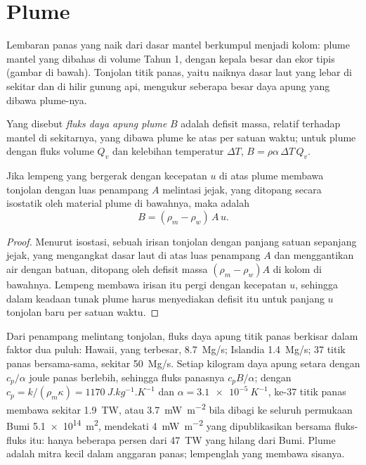 \section{Plume}

Lembaran panas yang naik dari dasar mantel berkumpul menjadi kolom: plume mantel
yang dibahas di volume Tahun 1, dengan kepala besar dan ekor tipis (gambar di bawah).
Tonjolan titik panas, yaitu naiknya dasar laut yang lebar di sekitar dan di hilir
gunung api, mengukur seberapa besar daya apung yang dibawa plume-nya.

\begin{definition}\label{def:b3:mantle-convection:buoyancy-flux}
Yang disebut \emph{fluks daya apung plume} $B$ adalah defisit
massa, relatif terhadap mantel di sekitarnya, yang dibawa plume ke atas per satuan
waktu; untuk plume dengan fluks volume $Q_v$ dan kelebihan temperatur $\Delta T$,
$B = \rho\alpha\,\Delta T\,Q_v$.
\end{definition}

\begin{proposition}\label{prop:b3:mantle-convection:swell}
Jika lempeng yang bergerak dengan kecepatan $u$ di atas plume membawa tonjolan dengan
luas penampang $A$ melintasi jejak, yang ditopang secara isostatik oleh
material plume di bawahnya, maka  adalah
\[
  B = (\rho_m - \rho_w)\,A\,u .
\]
\end{proposition}

\begin{proof}
Menurut isostasi, sebuah irisan tonjolan dengan panjang satuan sepanjang jejak, yang
mengangkat dasar laut di atas luas penampang $A$ dan menggantikan air dengan
batuan, ditopang oleh defisit massa $(\rho_m - \rho_w)A$ di kolom di bawahnya.
Lempeng membawa irisan itu pergi dengan kecepatan $u$, sehingga dalam keadaan tunak
plume harus menyediakan defisit itu untuk panjang $u$ tonjolan baru per satuan waktu.
\end{proof}

Dari penampang melintang tonjolan, fluks daya apung titik panas berkisar dalam
faktor dua puluh: Hawaii, yang terbesar, \qty{8.7}{Mg/s}; Islandia
\qty{1.4}{Mg/s}; 37 titik panas bersama-sama, sekitar \qty{50}{Mg/s}. Setiap kilogram daya apung
setara dengan $c_p/\alpha$ joule panas berlebih, sehingga fluks panasnya $c_pB/\alpha$;
dengan $c_p = k/(\rho_m\kappa) = \qty{1170}{J.kg^{-1}.K^{-1}}$ dan $\alpha =
\qty{3.1e-5}{K^{-1}}$, ke-37 titik panas membawa sekitar \qty{1.9}{TW}, atau
\qty{3.7}{mW.m^{-2}} bila dibagi ke seluruh permukaan Bumi \qty{5.1e14}{m^2}, mendekati
\qty{4}{mW.m^{-2}} yang dipublikasikan bersama fluks-fluks itu: hanya beberapa persen dari
\qty{47}{TW} yang hilang dari Bumi. Plume adalah mitra kecil dalam
anggaran panas; lempenglah yang membawa sisanya.

